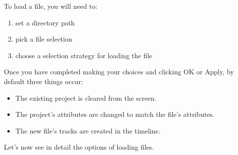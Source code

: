 \vspace{1ex} \noindent To load a file, you will need to:

\begin{enumerate}
    \item set a directory path
    \item pick a file selection
    \item choose a selection strategy for loading the file
\end{enumerate}

\noindent Once you have completed making your choices and clicking OK or Apply, by default three things occur:

\begin{itemize}[noitemsep]
    \item The existing project is cleared from the screen.
    \item The project's attributes are changed to match the file's attributes.
    \item The new file's tracks are created in the timeline.
\end{itemize}

\noindent Let's now see in detail the options of loading files.

